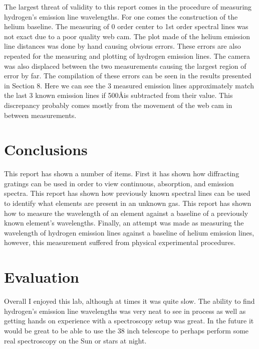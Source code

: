 \documentclass{article}
\begin{document}
The largest threat of validity to this report comes in the procedure of measuring
hydrogen's emission line wavelengths. For one comes the construction of the helium
baseline. The measuring of 0 order center to 1st order spectral lines was not exact
due to a poor quality web cam. The plot made of the helium emission line distances
was done by hand causing obvious errors. These errors are also repeated for the measuring
and plotting of hydrogen emission lines. The camera was also displaced between the two
measurements causing the largest region of error by far. The compilation of these errors
can be seen in the results presented in Section 8. Here we can see the 3 measured 
emission lines approximately match the last 3 known emission lines if 500\AA is 
subtracted from their value. This discrepancy probably comes mostly from the movement
of the web cam in between measurements.



\section{Conclusions}

This report has shown a number of items. First it has shown how diffracting gratings
can be used in order to view continuous, absorption, and emission spectra. This
report has shown how previously known spectral lines can be used to identify what
elements are present in an unknown gas. This report has shown how to measure
the wavelength of an element against a baseline of a previously known element's
wavelengths. Finally, an attempt was made as measuring the wavelength of hydrogen
emission lines against a baseline of helium emission lines, however, this measurement
suffered from physical experimental procedures.\\


\section{Evaluation}

Overall I enjoyed this lab, although at times it was quite slow. The ability to find
hydrogen's emission line wavelengths was very neat to see in process as well as
getting hands on experience with a spectroscopy setup was great. In the future it
would be great to be able to use the 38 inch telescope to perhaps perform some real
spectroscopy on the Sun or stars at night.\\
\end{document}
